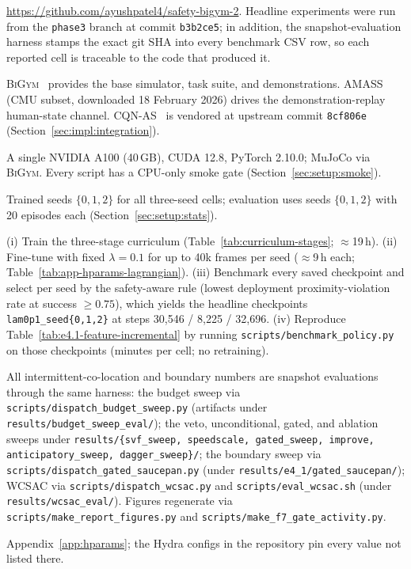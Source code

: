 \documentclass[11pt,a4paper]{report}
\newcommand{\bigym}{\textsc{BiGym}}
\newcommand{\cqnas}{CQN-AS}
\begin{document}
\begin{description}[leftmargin=2em,style=nextline]
\item[Code] \url{https://github.com/ayushpatel4/safety-bigym-2}.
  Headline experiments were run from the \texttt{phase3}
  branch at commit \texttt{b3b2ce5}; in addition, the
  snapshot-evaluation harness stamps the exact git SHA into every
  benchmark CSV row, so each reported cell is traceable to the code
  that produced it.
\item[Upstream assets] \bigym{}~\cite{chernyadev2024bigym} provides
  the base simulator, task suite, and demonstrations. AMASS~\cite{mahmood2019amass}
  (CMU subset, downloaded 18 February 2026) drives the
  demonstration-replay human-state channel. \cqnas{}~\cite{seo2024cqnas}
  is vendored at upstream commit \texttt{8cf806e}
  (Section~\ref{sec:impl:integration}).
\item[Hardware and software] A single NVIDIA A100 (40\,GB), CUDA 12.8,
  PyTorch 2.10.0; MuJoCo via \bigym{}. Every script has a CPU-only
  smoke gate (Section~\ref{sec:setup:smoke}).
\item[Seeds] Trained seeds $\{0, 1, 2\}$ for all three-seed cells;
  evaluation uses seeds $\{0, 1, 2\}$ with 20 episodes each
  (Section~\ref{sec:setup:stats}).
\item[Headline recipe (R1)] (i) Train the three-stage curriculum
  (Table~\ref{tab:curriculum-stages}; $\approx$19\,h). (ii) Fine-tune
  with fixed $\lambda = 0.1$ for up to 40k frames per seed
  ($\approx$9\,h each; Table~\ref{tab:app-hparams-lagrangian}).
  (iii) Benchmark every saved checkpoint and select per seed by the
  safety-aware rule (lowest deployment proximity-violation rate at success
  $\ge 0.75$), which yields the headline checkpoints
  \texttt{lam0p1\_seed\{0,1,2\}} at steps 30{,}546 / 8{,}225 /
  32{,}696. (iv) Reproduce
  Table~\ref{tab:e4.1-feature-incremental} by running
  \texttt{scripts/benchmark\_policy.py} on those checkpoints
  (minutes per cell; no retraining).
\item[Headline recipe (R2/R3)] All intermittent-co-location and
  boundary numbers are snapshot evaluations through the same
  harness: the budget sweep via
  \texttt{scripts/dispatch\_budget\_sweep.py} (artifacts under
  \texttt{results/budget\_sweep\_eval/}); the veto, unconditional,
  gated, and ablation sweeps under \texttt{results/\{svf\_sweep,
  speedscale, gated\_sweep, improve, anticipatory\_sweep,
  dagger\_sweep\}/}; the boundary sweep via
  \texttt{scripts/dispatch\_gated\_saucepan.py} (under
  \texttt{results/e4\_1/gated\_saucepan/}); WCSAC via
  \texttt{scripts/dispatch\_wcsac.py} and
  \texttt{scripts/eval\_wcsac.sh} (under
  \texttt{results/wcsac\_eval/}). Figures regenerate via
  \texttt{scripts/make\_report\_figures.py} and
  \texttt{scripts/make\_f7\_gate\_activity.py}.
\item[Hyperparameters] Appendix~\ref{app:hparams}; the Hydra configs
  in the repository pin every value not listed there.
\end{description}
\end{document}
